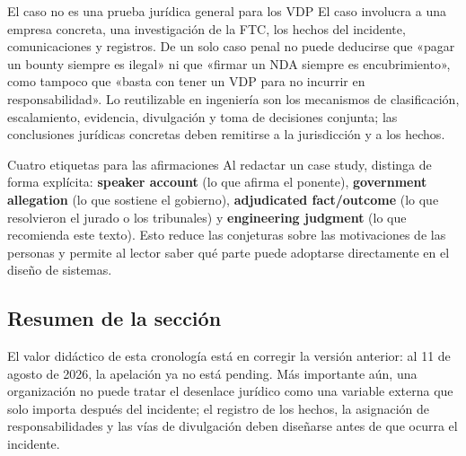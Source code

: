 \begin{warningbox}{El caso no es una prueba jurídica general para los VDP}
El caso involucra a una empresa concreta, una investigación de la FTC, los hechos del incidente, comunicaciones y registros. De un solo caso penal no puede deducirse que «pagar un bounty siempre es ilegal» ni que «firmar un NDA siempre es encubrimiento», como tampoco que «basta con tener un VDP para no incurrir en responsabilidad». Lo reutilizable en ingeniería son los mecanismos de clasificación, escalamiento, evidencia, divulgación y toma de decisiones conjunta; las conclusiones jurídicas concretas deben remitirse a la jurisdicción y a los hechos.
\end{warningbox}


\begin{importantbox}{Cuatro etiquetas para las afirmaciones}
Al redactar un case study, distinga de forma explícita: \textbf{speaker account} (lo que afirma el ponente), \textbf{government allegation} (lo que sostiene el gobierno), \textbf{adjudicated fact/outcome} (lo que resolvieron el jurado o los tribunales) y \textbf{engineering judgment} (lo que recomienda este texto). Esto reduce las conjeturas sobre las motivaciones de las personas y permite al lector saber qué parte puede adoptarse directamente en el diseño de sistemas.
\end{importantbox}

\subsection{Resumen de la sección}

El valor didáctico de esta cronología está en corregir la versión anterior: al 11 de agosto de 2026, la apelación ya no está pending. Más importante aún, una organización no puede tratar el desenlace jurídico como una variable externa que solo importa después del incidente; el registro de los hechos, la asignación de responsabilidades y las vías de divulgación deben diseñarse antes de que ocurra el incidente.

